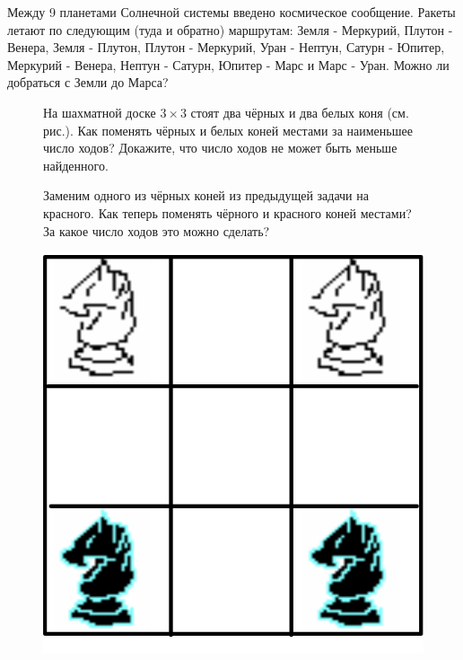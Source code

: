 
\begin{thm} \label{7.0 thm1}
    Между 9 планетами Солнечной системы введено космическое сообщение. Ракеты летают по следующим (туда и обратно) маршрутам: Земля - Меркурий, Плутон - Венера, Земля - Плутон, Плутон - Меркурий, Уран - Нептун, Сатурн - Юпитер, Меркурий - Венера, Нептун - Сатурн, Юпитер - Марс и Марс - Уран. Можно ли добраться с Земли до Марса?
\end{thm}

{\setlength{\intextsep}{2pt}
\begin{figure}[h]
\begin{minipage}{0.8\linewidth}\setlength{\parindent}{1.5em}
\begin{thm} 
    На шахматной доске $3 \times 3$ стоят два чёрных и два белых коня (см. рис.). Как поменять чёрных и белых коней местами за наименьшее число ходов? Докажите, что число ходов не может быть меньше найденного. 
\end{thm}
\begin{thm}
    Заменим одного из чёрных коней из предыдущей задачи на красного. Как теперь поменять чёрного и красного коней местами? За какое число ходов это можно сделать?
\end{thm}
\end{minipage}
\hfill
\begin{minipage}{0.17\linewidth}
    \includegraphics[width=0.9\columnwidth]{img/knight1.png}
\end{minipage}
\end{figure}}


